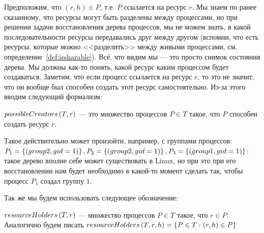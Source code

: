 Предположим, что $(r, h) \in P$, т.е. $P$ ссылается на ресурс $r$. Мы знаем по ранее сказанному, что ресурсы могут быть разделены между процессами, но при решении задачи восстановления дерева процессов, мы не можем знать, в какой последовательности ресурсы передавались друг между другом (вспомни, что есть ресурсы, которые можно <<разделить>> между живыми процессами, см. определение~\ref{def:issharable}). Всё, что видим мы --- это просто снимок состояния дерева. Мы должны как-то понять, какой ресурс каким процессом будет создаваться. Заметим, что если процесс ссылается на ресурс $r$, то это не значит, что он вообще был способен создать этот ресурс самостоятельно. Из-за этого вводим следующий формализм:

\begin{defn}
\label{def:possiblecrtrs}
$possibleCreators\left( T, r \right)$ --- это множество процессов $P \in T$ такое, что $P$ способен создать ресурс $r$.
\end{defn}

Такое действительно может произойти, например, с группами процессов: 
$P_1 = \left\lbrace (group 2, gid=1) \right\rbrace, P_2 = \left\lbrace (group 2, gid=1) \right\rbrace, P_3 = \left\lbrace (group 1, gid=1) \right\rbrace$: 
такое дерево вполне себе может существовать в Linux, но при это при его восстановлении нам будет необходимо 
в какой-то момент сделать так, чтобы процесс $P_1$ создал группу $1$.

Так же мы будем использовать следующее обозначение:

\begin{defn}
\label{def:resourceholders}
$resourceHolders\left( T, r \right)$ --- множество процессов $P \in T$ такое, что $r \in P$. Аналогично будем писать $resourceHolders\left( T, r, h \right) = \left\lbrace P \in T: (r, h) \in P \right\rbrace$
\end{defn}

